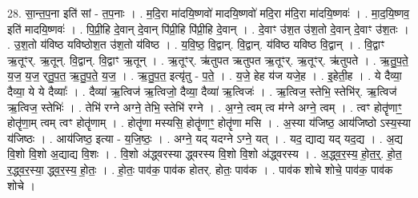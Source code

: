 \documentclass[17pt]{extarticle}
\begin{document}
28. सा॒न्त॒प॒ना इति॑ सां - त॒प॒नाः । . म॒दि॒रा मा॑दयि॒ष्णवो॑ मादयि॒ष्णवो॑ मदि॒रा म॑दि॒रा मा॑दयि॒ष्णवः॑ । . मा॒द॒यि॒ष्णव॒ इति॑ मादयि॒ष्णवः॑ । . पि॒प्री॒हि दे॒वान् दे॒वान् पि॑प्री॒हि पि॑प्री॒हि दे॒वान् । . दे॒वाꣳ उ॑श॒त उ॑श॒तो दे॒वान् दे॒वाꣳ उ॑श॒तः । . उ॒श॒तो य॑विष्ठ यविष्ठोश॒त उ॑श॒तो य॑विष्ठ । . य॒वि॒ष्ठ॒ वि॒द्वान्. वि॒द्वान्. य॑विष्ठ यविष्ठ वि॒द्वान् । . वि॒द्वाꣳ ऋ॒तूꣳर्. ऋ॒तून्. वि॒द्वान्. वि॒द्वाꣳ ऋ॒तून् । . ऋ॒तूꣳर्. ऋ॑तुपत ऋतुपत ऋ॒तूꣳर्. ऋ॒तूꣳर्. ऋ॑तुपते । . ऋ॒तु॒प॒ते॒ य॒ज॒ य॒ज॒ र्‌तु॒प॒त॒ ऋ॒तु॒प॒ते॒ य॒ज॒ । . ऋ॒तु॒प॒त॒ इत्यृ॑तु - प॒ते॒ । . य॒जे॒ हेह य॑ज यजे॒ह । . इ॒हेती॒ह । . ये दैव्या॒ दैव्या॒ ये ये दैव्याः᳚ । . दैव्या॑ ऋ॒त्विज॑ ऋ॒त्विजो॒ दैव्या॒ दैव्या॑ ऋ॒त्विजः॑ । . ऋ॒त्विज॒ स्तेभि॒ स्तेभि॑र्. ऋ॒त्विज॑ ऋ॒त्विज॒ स्तेभिः॑ । . तेभि॑ रग्ने अग्ने॒ तेभि॒ स्तेभि॑ रग्ने । . अ॒ग्ने॒ त्वम् त्व म॑ग्ने अग्ने॒ त्वम् । . त्वꣳ होतॄ॑णाꣳ॒॒ होतॄ॑णा॒म् त्वम् त्वꣳ होतॄ॑णाम् । . होतॄ॑णा मस्यसि॒ होतॄ॑णाꣳ॒॒ होतॄ॑णा मसि । . अ॒स्या य॑जिष्ठ॒ आय॑जिष्ठो ऽस्य॒स्या य॑जिष्ठः । . आय॑जिष्ठ॒ इत्या - य॒जि॒ष्ठः॒ । . अग्ने॒ यद् यदग्ने ऽग्ने॒ यत् । . यद॒ द्याद्य यद् यद॒द्य । . अ॒द्य वि॒शो वि॒शो अ॒द्याद्य वि॒शः । . वि॒शो अ॑द्ध्वरस्या द्ध्वरस्य वि॒शो वि॒शो अ॑द्ध्वरस्य । . अ॒द्ध्व॒र॒स्य॒ हो॒त॒र्॒. हो॒त॒ र॒द्ध्व॒र॒स्या॒ द्ध्व॒र॒स्य॒ हो॒तः॒ । . हो॒तः॒ पाव॑क॒ पाव॑क होतर्. होतः॒ पाव॑क । . पाव॑क शोचे शोचे॒ पाव॑क॒ पाव॑क शोचे । \newline
\end{document}
